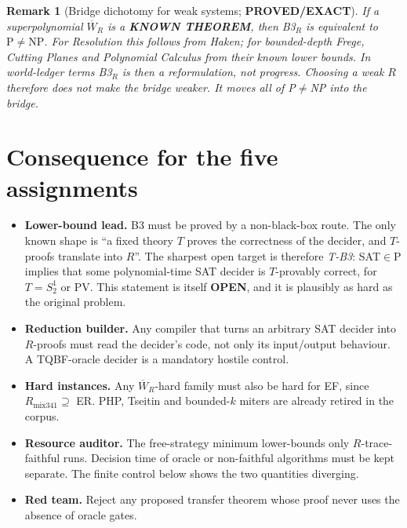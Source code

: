 \documentclass[11pt]{article}
\newtheorem{remark}[theorem]{Remark}
\newcommand{\W}{\overline W}
\begin{document}
\begin{remark}[Bridge dichotomy for weak systems; \textbf{PROVED/EXACT}]
If a superpolynomial $\W_R$ is a \textbf{KNOWN THEOREM}, then B3$_R$ is equivalent to $\mathrm P\neq\mathrm{NP}$.
For Resolution this follows from Haken; for bounded-depth Frege, Cutting Planes and Polynomial Calculus from their known lower bounds.
In world-ledger terms B3$_R$ is then a \emph{reformulation}, not progress.
Choosing a weak $R$ therefore does not make the bridge weaker. It moves all of
P$\neq$NP into the bridge.
\end{remark}

\section{Consequence for the five assignments}
\begin{itemize}
\item \textbf{Lower-bound lead.} B3 must be proved by a non-black-box route. The only known
shape is ``a fixed theory $T$ proves the correctness of the decider, and $T$-proofs translate into $R$''.
The sharpest open target is therefore \emph{T-B3}: SAT$\in$P implies that some polynomial-time SAT decider is $T$-provably
correct, for $T=S^1_2$ or PV. This statement is itself \textbf{OPEN}, and it is plausibly as hard as the original problem.
\item \textbf{Reduction builder.} Any compiler that turns an arbitrary SAT decider into $R$-proofs must read the
decider's code, not only its input/output behaviour. A TQBF-oracle decider is a mandatory hostile control.
\item \textbf{Hard instances.} Any $\W_R$-hard family must also be hard for EF, since $R_{\mathrm{mix341}}\supseteq$ ER.
PHP, Tseitin and bounded-$k$ miters are already retired in the corpus.
\item \textbf{Resource auditor.} The free-strategy minimum lower-bounds only $R$-trace-faithful runs.
Decision time of oracle or non-faithful algorithms must be kept separate.
The finite control below shows the two quantities diverging.
\item \textbf{Red team.} Reject any proposed transfer theorem whose proof never uses the absence of oracle gates.
\end{itemize}
\end{document}
